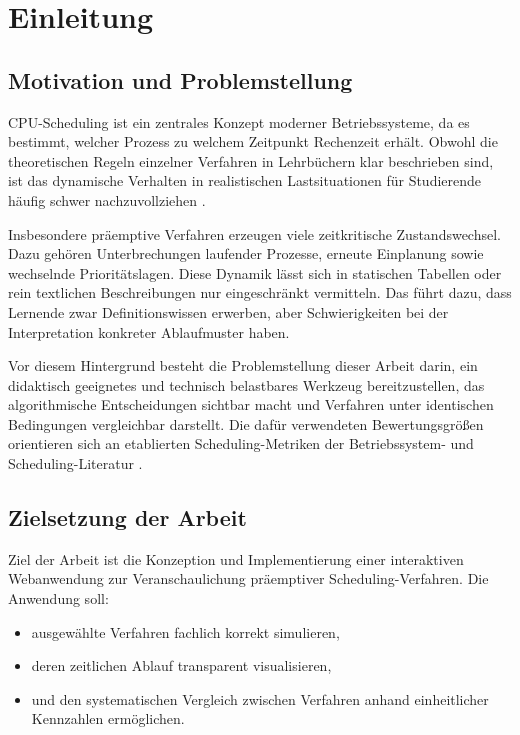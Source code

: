 \chapter{Einleitung}

\section{Motivation und Problemstellung}

CPU-Scheduling ist ein zentrales Konzept moderner Betriebssysteme, da es bestimmt, welcher Prozess zu welchem Zeitpunkt Rechenzeit erhält. Obwohl die theoretischen Regeln einzelner Verfahren in Lehrbüchern klar beschrieben sind, ist das dynamische Verhalten in realistischen Lastsituationen für Studierende häufig schwer nachzuvollziehen \cite{silberschatz2018operating,tanenbaum2014modern}.

Insbesondere präemptive Verfahren erzeugen viele zeitkritische Zustandswechsel. Dazu gehören Unterbrechungen laufender Prozesse, erneute Einplanung sowie wechselnde Prioritätslagen. Diese Dynamik lässt sich in statischen Tabellen oder rein textlichen Beschreibungen nur eingeschränkt vermitteln. Das führt dazu, dass Lernende zwar Definitionswissen erwerben, aber Schwierigkeiten bei der Interpretation konkreter Ablaufmuster haben.

Vor diesem Hintergrund besteht die Problemstellung dieser Arbeit darin, ein didaktisch geeignetes und technisch belastbares Werkzeug bereitzustellen, das algorithmische Entscheidungen sichtbar macht und Verfahren unter identischen Bedingungen vergleichbar darstellt. Die dafür verwendeten Bewertungsgrößen orientieren sich an etablierten Scheduling-Metriken der Betriebssystem- und Scheduling-Literatur \cite{silberschatz2018operating,pinedo2016scheduling}.

\section{Zielsetzung der Arbeit}

Ziel der Arbeit ist die Konzeption und Implementierung einer interaktiven Webanwendung zur Veranschaulichung präemptiver Scheduling-Verfahren. Die Anwendung soll:

\begin{itemize}
    \item ausgewählte Verfahren fachlich korrekt simulieren,
    \item deren zeitlichen Ablauf transparent visualisieren,
    \item und den systematischen Vergleich zwischen Verfahren anhand einheitlicher Kennzahlen ermöglichen.
\end{itemize}

